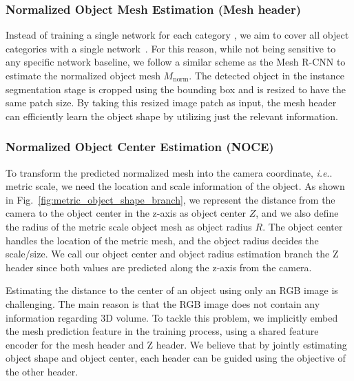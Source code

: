 \documentclass[letterpaper, 10 pt, journal, twoside]{IEEEtran}
\makeatletter
\DeclareRobustCommand\onedot{\futurelet\@let@token\@onedot}
\def\@onedot{\ifx\@let@token.\else.\null\fi\xspace}
\def\ie{\emph{i.e}\onedot} \def\Ie{\emph{I.e}\onedot}
\newcommand{\figref}[1]{Fig.~\ref{#1}}
\makeatother
\begin{document}
\subsubsection{Normalized Object Mesh Estimation (Mesh header)}
\label{subsec:mesh_header}
Instead of training a single network for each category \cite{peng2019pvnet, rad2017bb8_indirect, tekin2018real_indirect, tremblay2018deep}, we aim to cover all object categories with a single network~\cite{Tian2020prior, wang2019normalized}.
For this reason, while not being sensitive to any specific network baseline, we follow a similar scheme as the Mesh R-CNN \cite{gkioxari2019mesh} to estimate the normalized object mesh $M_{\text{norm}}$.
The detected object in the instance segmentation stage is cropped using the bounding box and is resized to have the same patch size.
By taking this resized image patch as input, the mesh header can efficiently learn the object shape by utilizing just the relevant information.


\subsubsection{Normalized Object Center Estimation (NOCE)}
\label{subsec:noce}
To transform the predicted normalized mesh into the camera coordinate, \ie metric scale, we need the location and scale information of the object.
As shown in \figref{fig:metric_object_shape_branch}, we represent the distance from the camera to the object center in the z-axis as object center $Z$, and we also define the radius of the metric scale object mesh as object radius $R$.
The object center handles the location of the metric mesh, and the object radius decides the scale/size.
We call our object center and object radius estimation branch the Z header since both values are predicted along the z-axis from the camera.

Estimating the distance to the center of an object using only an RGB image is challenging.
The main reason is that the RGB image does not contain any information regarding 3D volume.
To tackle this problem, we implicitly embed the mesh prediction feature in the training process, using a shared feature encoder for the mesh header and Z header.
We believe that by jointly estimating object shape and object center, each header can be guided using the objective of the other header.
\end{document}
